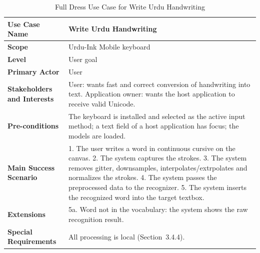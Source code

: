 \documentclass[12pt,a4paper]{report}
\begin{document}
{\small\renewcommand{\arraystretch}{1.15}
\begin{longtable}{|>{\bfseries}p{1.45in}|p{4.2in}|}
\caption{Full Dress Use Case for Write Urdu Handwriting}\label{tab:fd1}\\
\hline
Use Case Name & Write Urdu Handwriting\\\hline
Scope & Urdu-Ink Mobile keyboard\\\hline
Level & User goal\\\hline
Primary Actor & User\\\hline
Stakeholders and Interests & User: wants fast and correct conversion of handwriting into text. Application owner: wants the host application to receive valid Unicode. \\\hline
Pre-conditions & The keyboard is installed and selected as the active input method; a text field of a host application has focus; the models are loaded.\\\hline
Main Success Scenario & 1. The user writes a word in continuous cursive on the canvas. 2. The system captures the strokes. 3. The system removes gitter, downsamples, interpolates/extrpolates and normalizes the strokes. 4. The system passes the preprocessed data to the recognizer. 5. The system inserts the recognized word into the target textbox. \\\hline
Extensions & 5a. Word not in the vocabulary: the system shows the raw recognition result.\\\hline
Special Requirements &  All processing is local (Section~3.4.4).\\\hline
\end{longtable}}

\end{document}
